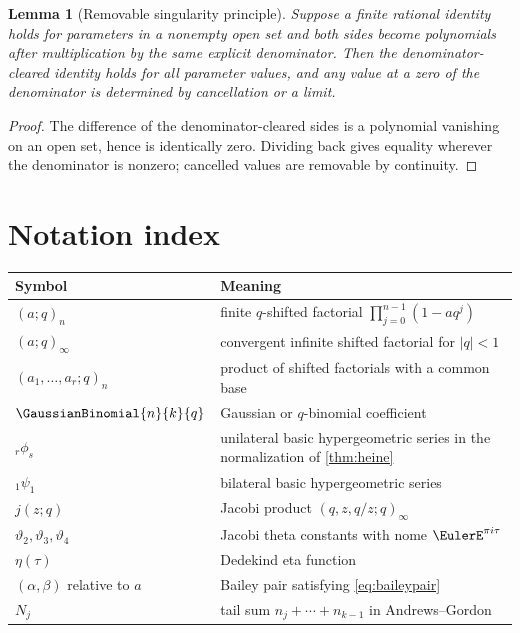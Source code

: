 \documentclass[11pt]{article}
\numberwithin{equation}{section}
\newtheorem{lemma}[theorem]{Lemma}
\theoremstyle{definition}
\theoremstyle{remark}
\begin{document}
\begin{lemma}[Removable singularity principle]\label{lem:removable}
Suppose a finite rational identity holds for parameters in a nonempty open
set and both sides become polynomials after multiplication by the same
explicit denominator.  Then the denominator-cleared identity holds for all
parameter values, and any value at a zero of the denominator is determined by
cancellation or a limit.
\end{lemma}
\begin{proof}
The difference of the denominator-cleared sides is a polynomial vanishing on
an open set, hence is identically zero.  Dividing back gives equality wherever
the denominator is nonzero; cancelled values are removable by continuity.
\end{proof}

\section{Notation index}

\begin{center}
\begin{tabularx}{0.92\textwidth}{@{}lX@{}}
\toprule
Symbol & Meaning\\
\midrule
$(a;q)_n$ & finite $q$-shifted factorial
$\prod_{j=0}^{n-1}(1-aq^j)$\\
$(a;q)_\infty$ & convergent infinite shifted factorial for $|q|<1$\\
$(a_1,\ldots,a_r;q)_n$ & product of shifted factorials with a common base\\
$\GaussianBinomial{n}{k}{q}$ & Gaussian or $q$-binomial coefficient\\
${}_r\phi_s$ & unilateral basic hypergeometric series in the normalization of
\cref{thm:heine}\\
${}_1\psi_1$ & bilateral basic hypergeometric series\\
$j(z;q)$ & Jacobi product $(q,z,q/z;q)_\infty$\\
$\vartheta_2,\vartheta_3,\vartheta_4$ & Jacobi theta constants with nome
$\EulerE^{\pi i\tau}$\\
$\eta(\tau)$ & Dedekind eta function\\
$(\alpha,\beta)$ relative to $a$ & Bailey pair satisfying
\eqref{eq:baileypair}\\
$N_j$ & tail sum $n_j+\cdots+n_{k-1}$ in Andrews--Gordon\\
\bottomrule
\end{tabularx}
\end{center}
\end{document}

